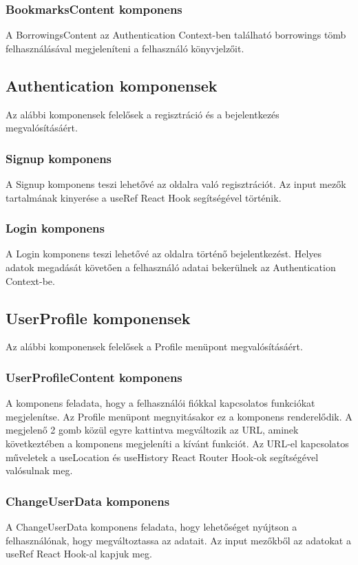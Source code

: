 \subsubsection{BookmarksContent komponens}
A BorrowingsContent az Authentication Context-ben található borrowings tömb felhasználásával megjeleníteni a felhasználó könyvjelzőit.

\subsection{Authentication komponensek}
Az alábbi komponensek felelősek a regisztráció és a bejelentkezés megvalósításáért.

\subsubsection{Signup komponens}
A Signup komponens teszi lehetővé az oldalra való regisztrációt.  Az input mezők tartalmának kinyerése a useRef React Hook segítségével történik. 

\subsubsection{Login komponens}
A Login komponens teszi lehetővé az oldalra történő bejelentkezést. Helyes adatok megadását követően a felhasználó adatai bekerülnek az Authentication Context-be.

\subsection{UserProfile komponensek}
Az alábbi komponensek felelősek a Profile menüpont megvalósításáért.

\subsubsection{UserProfileContent komponens}
A komponens feladata, hogy a felhasználói fiókkal kapcsolatos funkciókat megjelenítse. Az Profile menüpont megnyitásakor ez a komponens renderelődik. A megjelenő 2 gomb közül egyre kattintva megváltozik az URL, aminek következtében a komponens megjeleníti a kívánt funkciót. Az URL-el kapcsolatos műveletek a useLocation és useHistory React Router Hook-ok segítségével valósulnak meg.

\subsubsection{ChangeUserData komponens}
A ChangeUserData komponens feladata, hogy lehetőséget nyújtson a felhasználónak, hogy megváltoztassa az adatait. Az input mezőkből az adatokat a useRef React Hook-al kapjuk meg.

